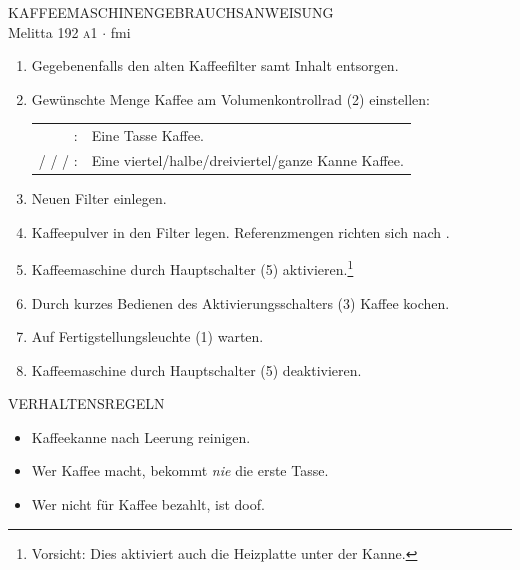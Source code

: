 \documentclass[a4paper,11pt]{article}
\newcommand\singlecup{%
    \begin{tikzpicture}[line width=0.17ex,scale=0.7]
        \draw (-1.35ex,0ex) to[out=-45,in=180] (-0.8ex,-0.3ex) -- (0.8ex,-0.3ex) to[out=0,in=-135] (1.35ex,0ex);
        \fill (-0.92ex,1.5ex) -- (-0.92ex,0.5ex) to[out=270,in=180] (-0.3ex,-0.3ex) -- (0.3ex,-0.3ex) to[out=0,in=270] (0.92ex,0.5ex) -- (0.92ex,1.5ex) node (tr) {};
        \draw ($(tr.center) + (0,-0.15ex)$) to[out=0,in=90] ++(0.39ex,-0.3ex) to[out=270,in=0] ++(-0.39ex,-0.3ex);
    \end{tikzpicture}
}
\newcommand{\coffeecup}{\smash{\raisebox{0.6ex}{\singlecup}\hspace{-0.95em}\singlecup}}
\newcommand{\kettle}[1]{
    \smash{
        \begin{tikzpicture}[line width=0.2ex,scale=0.6,baseline=-0.5ex]
            \draw[semithick] (-1.7ex,2.1ex) -- (-1.3ex,1.7ex) -- (-1.3ex,-1.2ex) to[out=270,in=180] (-1.0ex,-1.5ex) -- (1.2ex,-1.5ex) to[out=0,in=270] (1.5ex,-1.2ex) -- (1.5ex,2.1ex) -- (1.7ex,2.1ex) to[out=0,in=90] (2.0ex,1.8ex) -- (2.0ex,-0.5ex) to[out=270,in=0] (1.7ex,-0.8ex) -- (1.5ex,-0.8ex);
            \foreach \y in {1,...,#1} { \node[fill,inner sep=0,rounded corners=0.1ex,minimum width=1.32ex,minimum height=0.35ex] at (0.1ex,{0.8ex*\y-1.67ex}) {}; }
        \end{tikzpicture}
    }
}
\begin{document}
%
\begin{center}%
    KAFFEEMASCHINENGEBRAUCHSANWEISUNG\\
    Melitta 192 \textsc{a}1 $\cdot$ fmi
\end{center}
\begin{enumerate}[label={\textsc{schritt \arabic*:}},leftmargin=5.4em]
    \item Gegebenenfalls den alten Kaffeefilter samt Inhalt entsorgen.
    \item Gewünschte Menge Kaffee am Volumenkontrollrad (2) einstellen:

        \begin{tabular}{@{}rl@{}}
            \coffeecup:                          & Eine Tasse Kaffee.                                 \\
            \kettle1/\kettle2/\kettle3/\kettle4: & Eine viertel/halbe/dreiviertel/ganze Kanne Kaffee.
        \end{tabular}
    \item Neuen Filter einlegen.
    \item Kaffeepulver in den Filter legen.
        Referenzmengen richten sich nach .
    \item Kaffeemaschine durch Hauptschalter (5) aktivieren.\footnote{Vorsicht: Dies aktiviert auch die Heizplatte unter der Kanne.}
    \item Durch kurzes Bedienen des Aktivierungsschalters (3) Kaffee kochen.
    \item Auf Fertigstellungsleuchte (1) warten.
    \item Kaffeemaschine durch Hauptschalter (5) deaktivieren.
\end{enumerate}

\begin{center}
    VERHALTENSREGELN
\end{center}
\begin{itemize}[leftmargin=0em]
    \item Kaffeekanne nach Leerung reinigen.
    \item Wer Kaffee macht, bekommt \emph{nie} die erste Tasse.
    \item Wer nicht für Kaffee bezahlt, ist doof.
\end{itemize}

\vfill
\end{document}
